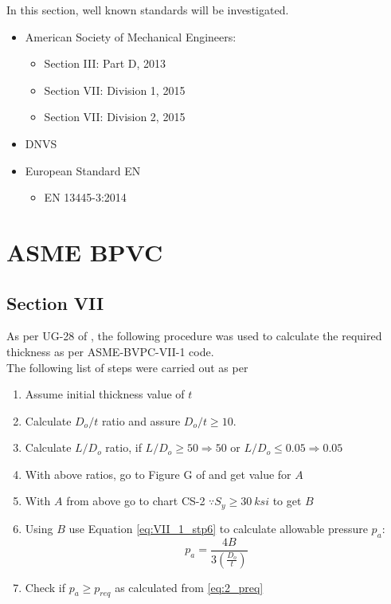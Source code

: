 
In this section, well known standards will be investigated.

\begin{itemize}
    \item American Society of Mechanical Engineers:
	    \begin{itemize}[label=$\bullet$]
	       	\item Section III: Part D, 2013	\citep{ASMEbvpcIID}
	    	\item Section VII: Division 1, 2015 \citep{ASMEbvpcVII1}
	    	\item Section VII: Division 2, 2015 \citep{ASMEbvpcVII2}
	    \end{itemize}
	\item DNVS
    \item European Standard EN
        \begin{itemize}[label=$\bullet$]
	       	\item EN 13445-3:2014
	    \end{itemize}
\end{itemize}

\section{ASME BPVC}

\subsection{Section VII}
As per UG-28 of \citep{ASMEbvpcVII1}, the following procedure was used to calculate the required thickness as per ASME-BVPC-VII-1 code.\\

The following list of steps were carried out as per \citep{ASMEbvpcVII1}\\

\begin{enumerate}
	\item Assume initial thickness value of $t$
	\item Calculate $D_o/t$ ratio and assure $D_o/t \geq 10$.
	\item Calculate $L/D_o$ ratio, if $L/D_o \geq 50 \Rightarrow 50$ or  $L/D_o \leq 0.05 \Rightarrow 0.05$
	\item With above ratios, go to Figure G of \citep{ASMEbvpcIID} and get value for $A$
	\item With $A$ from above go to chart CS-2 $\because S_y \geq 30 \ ksi$ to get $B$
	\item Using $B$ use Equation \ref{eq:VII_1_stp6} to calculate allowable pressure $p_a$:
		\begin{equation}
			\label{eq:3_VII1_stp6}
			p_a = \frac{4B}{3 \left(\frac{D_o}{t} \right)}
		\end{equation}
	\item Check if $p_a \geq p_{req}$ as calculated from \ref{eq:2_preq}
	
\end{enumerate}


